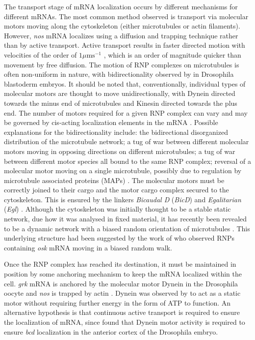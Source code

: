 \documentclass[twocolumn]{biophys}
\begin{document}
The transport stage of mRNA localization occurs by different mechanisms for different mRNAs.
The most common method observed is transport via molecular motors moving along the cytoskeleton (either microtubules or actin filaments). 
However, \textit{nos} mRNA localizes using a diffusion and trapping technique \citep{forrest2003live} rather than by active transport. 
Active transport results in faster directed motion with velocities of the order of $1 \mu \text{m} \text{s}^{-1}$ \citep{weil2006localization, zimyanin2008vivo}, which is an order of magnitude quicker than movement by free diffusion.
The motion of RNP complexes on microtubules is often non-uniform in nature, with bidirectionality observed by \citet{vendra2007dynactin} in Drosophila blastoderm embryos.
It should be noted that, conventionally, individual types of molecular motors are thought to move unidirectionally, with Dynein directed towards the minus end of microtubules and Kinesin directed towards the plus end.
The number of motors required for a given RNP complex can vary and may be governed by cis-acting localization elements in the mRNA \citep{amrute2012single}.
Possible explanations for the bidirectionality include: the bidirectional disorganized distribution of the microtubule network; a tug of war between different molecular motors moving in opposing directions on different microtubules; a tug of war between different motor species all bound to the same RNP complex; reversal of a molecular motor moving on a single microtubule, possibly due to regulation by microtubule associated proteins (MAPs) \citep{buxbaum2015right}. 
The molecular motors must be correctly joined to their cargo and the motor cargo complex secured to the cytoskeleton.
This is ensured by the linkers \textit{Bicaudal D} (\textit{BicD}) and \textit{Egalitarian} (\textit{Egl}) \citep{parton2014subcellular}. 
Although the cytoskeleton was initially thought to be a stable static network, due how it was analysed in fixed material, it has recently been revealed to be a dynamic network with a biased random orientation of microtubules \citep{parton20111}.
This underlying structure had been suggested by the work of \citet{zimyanin2008vivo} who observed RNPs containing \textit{osk} mRNA moving in a biased random walk.  

Once the RNP complex has reached its destination, it must be maintained in position by some anchoring mechanism to keep the mRNA localized within the cell.
\textit{grk} mRNA is anchored by the molecular motor Dynein \citep{delanoue2005dynein} in the Drosophila oocyte and \textit{nos} is trapped by actin \citep{forrest2003live}.
Dynein was observed by \citet{delanoue2005dynein} to act as a static motor without requiring further energy in the form of ATP to function. 
An alternative hypothesis is that continuous active transport is required to ensure the localization of mRNA, since \citet{weil2006localization} found that Dynein motor activity is required to ensure \textit{bcd} localization in the anterior cortex of the Drosophila embryo.
\end{document}
